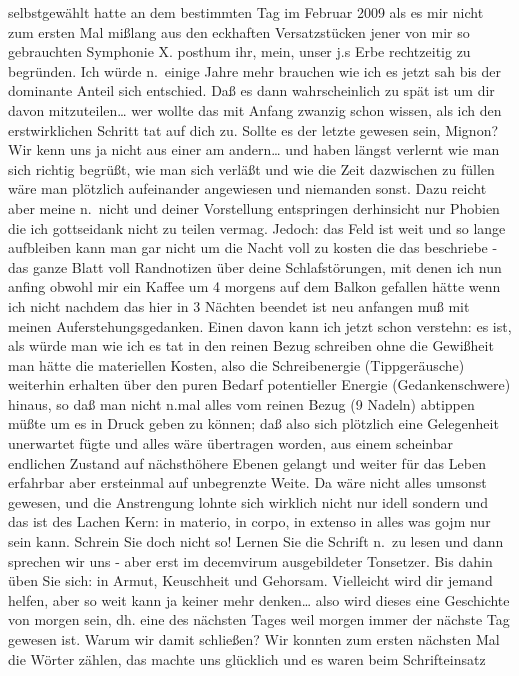\documentclass[
]{article}
\begin{document}
selbstgewählt hatte an dem bestimmten Tag im Februar 2009 als es mir
nicht zum ersten Mal mißlang aus den eckhaften Versatzstücken jener von
mir so gebrauchten Symphonie X. posthum ihr, mein, unser j.s Erbe
rechtzeitig zu begründen. Ich würde n.~einige Jahre mehr brauchen wie
ich es jetzt sah bis der dominante Anteil sich entschied. Daß es dann
wahrscheinlich zu spät ist um dir davon mitzuteilen\ldots{} wer wollte
das mit Anfang zwanzig schon wissen, als ich den erstwirklichen Schritt
tat auf dich zu. Sollte es der letzte gewesen sein, Mignon? Wir kenn uns
ja nicht aus einer am andern\ldots{} und haben längst verlernt wie man
sich richtig begrüßt, wie man sich verläßt und wie die Zeit dazwischen
zu füllen wäre man plötzlich aufeinander angewiesen und niemanden sonst.
Dazu reicht aber meine n.~nicht und deiner Vorstellung entspringen
derhinsicht nur Phobien die ich gottseidank nicht zu teilen vermag.
Jedoch: das Feld ist weit und so lange aufbleiben kann man gar nicht um
die Nacht voll zu kosten die das beschriebe - das ganze Blatt voll
Randnotizen über deine Schlafstörungen, mit denen ich nun anfing obwohl
mir ein Kaffee um 4 morgens auf dem Balkon gefallen hätte wenn ich nicht
nachdem das hier in 3 Nächten beendet ist neu anfangen muß mit meinen
Auferstehungsgedanken. Einen davon kann ich jetzt schon verstehn: es
ist, als würde man wie ich es tat in den reinen Bezug schreiben ohne die
Gewißheit man hätte die materiellen Kosten, also die Schreibenergie
(Tippgeräusche) weiterhin erhalten über den puren Bedarf potentieller
Energie (Gedankenschwere) hinaus, so daß man nicht n.mal alles vom
reinen Bezug (9 Nadeln) abtippen müßte um es in Druck geben zu können;
daß also sich plötzlich eine Gelegenheit unerwartet fügte und alles wäre
übertragen worden, aus einem scheinbar endlichen Zustand auf
nächsthöhere Ebenen gelangt und weiter für das Leben erfahrbar aber
ersteinmal auf unbegrenzte Weite. Da wäre nicht alles umsonst gewesen,
und die Anstrengung lohnte sich wirklich nicht nur idell sondern und das
ist des Lachen Kern: in materio, in corpo, in extenso in alles was gojm
nur sein kann. Schrein Sie doch nicht so! Lernen Sie die Schrift n.~zu
lesen und dann sprechen wir uns - aber erst im decemvirum ausgebildeter
Tonsetzer. Bis dahin üben Sie sich: in Armut, Keuschheit und Gehorsam.
Vielleicht wird dir jemand helfen, aber so weit kann ja keiner mehr
denken\ldots{} also wird dieses eine Geschichte von morgen sein, dh.
eine des nächsten Tages weil morgen immer der nächste Tag gewesen ist.
Warum wir damit schließen? Wir konnten zum ersten nächsten Mal die
Wörter zählen, das machte uns glücklich und es waren beim Schrifteinsatz
\end{document}
